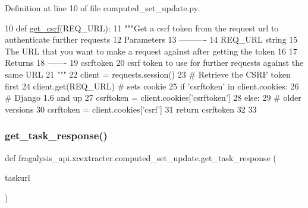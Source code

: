 Definition at line 10 of file computed\+\_\+set\+\_\+update.\+py.


\begin{DoxyCode}
10 \textcolor{keyword}{def }\hyperlink{namespacefragalysis__api_1_1xcextracter_1_1computed__set__update_a5737d189121121fcfc89d399bf38e877}{get\_csrf}(REQ\_URL):
11     \textcolor{stringliteral}{"""Get a csrf token from the request url to authenticate further requests}
12 \textcolor{stringliteral}{    Parameters}
13 \textcolor{stringliteral}{    ----------}
14 \textcolor{stringliteral}{    REQ\_URL string}
15 \textcolor{stringliteral}{        The URL that you want to make a request against after getting the token}
16 \textcolor{stringliteral}{    }
17 \textcolor{stringliteral}{    Returns}
18 \textcolor{stringliteral}{    -------}
19 \textcolor{stringliteral}{    csrftoken}
20 \textcolor{stringliteral}{        csrf token to use for further requests against the same URL}
21 \textcolor{stringliteral}{    """}
22     client = requests.session()
23     \textcolor{comment}{# Retrieve the CSRF token first}
24     client.get(REQ\_URL)  \textcolor{comment}{# sets cookie}
25     \textcolor{keywordflow}{if} \textcolor{stringliteral}{'csrftoken'} \textcolor{keywordflow}{in} client.cookies:
26         \textcolor{comment}{# Django 1.6 and up}
27         csrftoken = client.cookies[\textcolor{stringliteral}{'csrftoken'}]
28     \textcolor{keywordflow}{else}:
29         \textcolor{comment}{# older versions}
30         csrftoken = client.cookies[\textcolor{stringliteral}{'csrf'}]
31     \textcolor{keywordflow}{return} csrftoken
32 
33 
\end{DoxyCode}
\mbox{\label{namespacefragalysis__api_1_1xcextracter_1_1computed__set__update_a5065036bae4e3eea5df321d366767d29}} 
\subsubsection{\texorpdfstring{get\+\_\+task\+\_\+response()}{get\_task\_response()}}
{\footnotesize\ttfamily def fragalysis\+\_\+api.\+xcextracter.\+computed\+\_\+set\+\_\+update.\+get\+\_\+task\+\_\+response (\begin{DoxyParamCaption}\item[{}]{taskurl }\end{DoxyParamCaption})}

